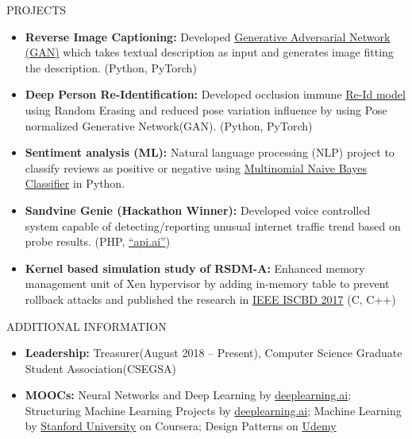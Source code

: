 \documentclass[]{mcdowellcv}
\begin{document}
	\begin{cvsection}{PROJECTS}
		\begin{cvsubsection}{}{}{}
			\begin{itemize}
    			\item \textbf{Reverse Image Captioning:} Developed  \href{https://github.com/aditya30394/Reverse-Image-Captioning}{Generative Adversarial Network (GAN)} which takes textual description as input and generates image fitting the description. (Python, PyTorch)
				\item \textbf{Deep Person Re-Identification:} Developed occlusion immune \href{https://github.com/aditya30394/Person-Re-Identification}{Re-Id model} using Random Erasing and reduced pose variation influence by using Pose normalized Generative Network(GAN). (Python, PyTorch)
				\item \textbf{Sentiment analysis (ML):} Natural language processing (NLP) project to classify reviews as positive or negative using \href{https://github.com/aditya30394/Review-Classifier}{Multinomial Naive Bayes Classifier} in Python.
				\item \textbf{Sandvine Genie (Hackathon Winner):} Developed voice controlled system capable of detecting/reporting unusual internet traffic trend based on probe results.  (PHP, \href{https://dialogflow.com/}{``api.ai''})
				\item \textbf{Kernel based simulation study of RSDM-A:} Enhanced memory management unit of Xen hypervisor by adding in-memory table to prevent rollback attacks and  published the research in \href{https://ieeexplore.ieee.org/document/8181523/}{IEEE ISCBD 2017} (C, C++)
			\end{itemize}
		\end{cvsubsection}
	\end{cvsection}
	
	\begin{cvsection}{ADDITIONAL INFORMATION}
		\begin{cvsubsection}{}{}{}	
			\begin{itemize}
				\item \textbf{Leadership:} Treasurer(August 2018 -- Present), Computer Science Graduate Student Association(CSEGSA)
				\item \textbf{MOOCs:} Neural Networks and Deep Learning by \href{https://www.coursera.org/account/accomplishments/verify/ZYYLP6LB9HPX}{deeplearning.ai}; Structuring Machine Learning Projects by \href{https://www.coursera.org/account/accomplishments/verify/8G7XPAQQZT28}{deeplearning.ai}; Machine Learning by \href{https://www.coursera.org/account/accomplishments/verify/NQRVPNVBEN4K}{Stanford University} on Coursera; Design Patterns on \href{https://www.udemy.com/certificate/UC-DWASSJ2I/}{Udemy}
			\end{itemize}
		\end{cvsubsection}
	\end{cvsection}
	
	
	
\end{document}
